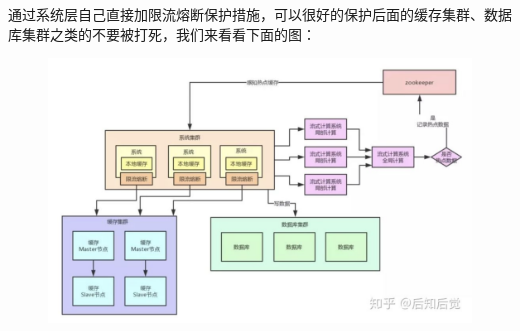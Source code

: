 \documentclass[12pt]{article}
\begin{document}
通过系统层自己直接加限流熔断保护措施，可以很好的保护后面的缓存集群、数据库集群之类的不要被打死，我们来看看下面的图：
\begin{figure}[H]
    \centering
    \includegraphics[width=.8\textwidth]{fig/Cache_Infrastructure_Hot_Key_9.png}
\end{figure}





























\end{document}
